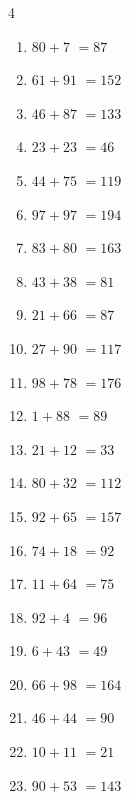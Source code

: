 \begin{multicols}{4}
\begin{enumerate}
  \item $80+7$
        $=87$

  \item $61+91$
        $=152$

  \item $46+87$
        $=133$

  \item $23+23$
        $=46$

  \item $44+75$
        $=119$

  \item $97+97$
        $=194$

  \item $83+80$
        $=163$

  \item $43+38$
        $=81$

  \item $21+66$
        $=87$

  \item $27+90$
        $=117$

  \item $98+78$
        $=176$

  \item $1+88$
        $=89$

  \item $21+12$
        $=33$

  \item $80+32$
        $=112$

\columnbreak %

  \item $92+65$
        $=157$

  \item $74+18$
        $=92$

  \item $11+64$
        $=75$

  \item $92+4$
        $=96$

  \item $6+43$
        $=49$

  \item $66+98$
        $=164$

  \item $46+44$
        $=90$

  \item $10+11$
        $=21$

  \item $90+53$
        $=143$


\end{enumerate}
\end{multicols}
